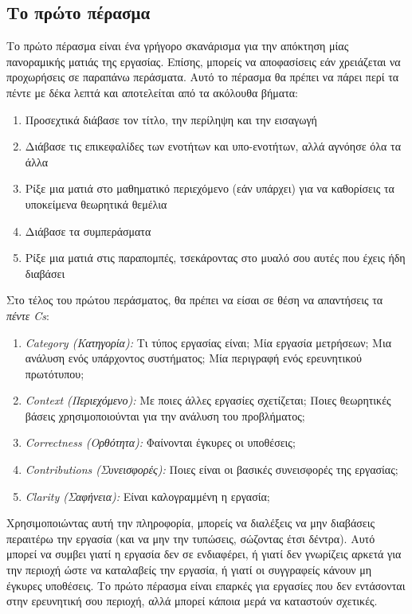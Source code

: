 \documentclass{article}
\begin{document}
\subsection{Το πρώτο πέρασμα}
\par
Το πρώτο πέρασμα είναι ένα γρήγορο σκανάρισμα για την απόκτηση μίας πανοραμικής ματιάς της εργασίας. Επίσης, μπορείς να αποφασίσεις εάν χρειάζεται να προχωρήσεις σε παραπάνω περάσματα. Αυτό το πέρασμα θα πρέπει να πάρει περί τα πέντε με δέκα λεπτά και αποτελείται από τα ακόλουθα βήματα:
\begin{enumerate}
    \item Προσεχτικά διάβασε τον τίτλο, την περίληψη και την εισαγωγή
    \item Διάβασε τις επικεφαλίδες των ενοτήτων και υπο-ενοτήτων, αλλά αγνόησε όλα τα άλλα
    \item Ρίξε μια ματιά στο μαθηματικό περιεχόμενο (εάν υπάρχει) για να καθορίσεις τα υποκείμενα θεωρητικά θεμέλια
    \item Διάβασε τα συμπεράσματα
    \item Ρίξε μια ματιά στις παραπομπές, τσεκάροντας στο μυαλό σου αυτές που έχεις ήδη διαβάσει
\end{enumerate}
\par
Στο τέλος του πρώτου περάσματος, θα πρέπει να είσαι σε θέση να απαντήσεις τα \textit{πέντε \textlatin{Cs}}:
\begin{enumerate}
    \item \textit{\textlatin{Category} (Κατηγορία):} Τι τύπος εργασίας είναι\textlatin{;} Μία εργασία μετρήσεων\textlatin{;} Μια ανάλυση ενός υπάρχοντος συστήματος\textlatin{;} Μία περιγραφή ενός ερευνητικού πρωτότυπου\textlatin{;}
    \item \textit{\textlatin{Context} (Περιεχόμενο):} Με ποιες άλλες εργασίες σχετίζεται\textlatin{;} Ποιες θεωρητικές βάσεις χρησιμοποιούνται για την ανάλυση του προβλήματος\textlatin{;}
    \item \textit{\textlatin{Correctness} (Ορθότητα):} Φαίνονται έγκυρες οι υποθέσεις\textlatin{;}
    \item \textit{\textlatin{Contributions} (Συνεισφορές):} Ποιες είναι οι βασικές συνεισφορές της εργασίας\textlatin{;}
    \item \textit{\textlatin{Clarity} (Σαφήνεια):} Είναι καλογραμμένη η εργασία\textlatin{;}
\end{enumerate}
\par
Χρησιμοποιώντας αυτή την πληροφορία, μπορείς να διαλέξεις να μην διαβάσεις περαιτέρω την εργασία (και να μην την τυπώσεις, σώζοντας έτσι δέντρα). Αυτό μπορεί να συμβει γιατί η εργασία δεν σε ενδιαφέρει, ή γιατί δεν γνωρίζεις αρκετά για την περιοχή ώστε να καταλαβείς την εργασία, ή γιατί οι συγγραφείς κάνουν μη έγκυρες υποθέσεις. Το πρώτο πέρασμα είναι επαρκές για εργασίες που δεν εντάσονται στην ερευνητική σου περιοχή, αλλά μπορεί κάποια μερά να καταστούν σχετικές.
\end{document}
